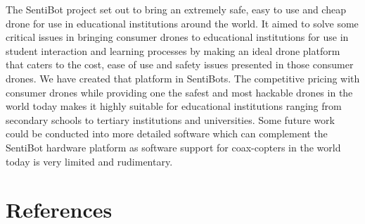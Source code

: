 \documentclass[12pt]{article}
\begin{document}
The SentiBot project set out to bring an extremely safe, easy to use and cheap drone for use in educational institutions around the world. It aimed to solve some critical issues in bringing consumer drones to educational institutions for use in student interaction and learning processes by making an ideal drone platform that caters to the cost, ease of use and safety issues presented in those consumer drones. We have created that platform in SentiBots. The competitive pricing with consumer drones while providing one the safest and most hackable drones in the world today makes it highly suitable for educational institutions ranging from secondary schools to tertiary institutions and universities. 
Some future work could be conducted into more detailed software which can complement the SentiBot hardware platform as software support for coax-copters in the world today is very limited and rudimentary.

\section{References}
\end{document}
